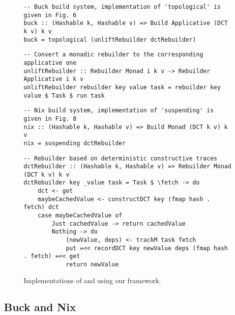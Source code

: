 \begin{figure}
\begin{verbatim}
-- Buck build system, implementation of 'topological' is given in Fig. 6
buck :: (Hashable k, Hashable v) => Build Applicative (DCT k v) k v
buck = topological (unliftRebuilder dctRebuilder)
\end{verbatim}
\vspace{1mm}
\begin{verbatim}
-- Convert a monadic rebuilder to the corresponding applicative one
unliftRebuilder :: Rebuilder Monad i k v -> Rebuilder Applicative i k v
unliftRebuilder rebuilder key value task = rebuilder key value $ Task $ run task
\end{verbatim}
\vspace{1mm}
\begin{verbatim}
-- Nix build system, implementation of 'suspending' is given in Fig. 8
nix :: (Hashable k, Hashable v) => Build Monad (DCT k v) k v
nix = suspending dctRebuilder
\end{verbatim}
\vspace{1mm}
\begin{verbatim}
-- Rebuilder based on deterministic constructive traces
dctRebuilder :: (Hashable k, Hashable v) => Rebuilder Monad (DCT k v) k v
dctRebuilder key _value task = Task $ \fetch -> do
    dct <- get
    maybeCachedValue <- constructDCT key (fmap hash . fetch) dct
    case maybeCachedValue of
        Just cachedValue -> return cachedValue
        Nothing -> do
            (newValue, deps) <- trackM task fetch
            put =<< recordDCT key newValue deps (fmap hash . fetch) =<< get
            return newValue
\end{verbatim}
\vspace{-2mm}
\caption{Implementations of \Buck and \Nix using our framework.}
\label{fig-buck-nix-implementation}
\vspace{-2mm}
\end{figure}

\subsection{Buck and Nix}

